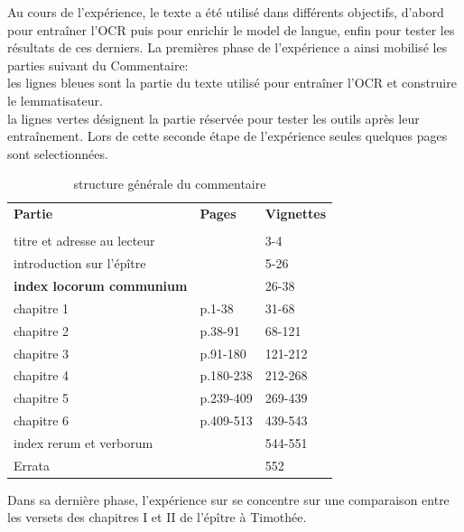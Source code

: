\documentclass[11pt,french]{article}
\begin{document}
Au cours de l'expérience, le texte a été utilisé dans différents objectifs, d'abord pour entraîner l'OCR puis pour enrichir le model de langue, enfin pour tester les résultats de ces derniers. La premières phase de l'expérience a ainsi mobilisé les parties suivant du Commentaire:\\ 
     les lignes bleues sont la partie du texte          utilisé pour entraîner l'OCR et construire le lemmatisateur.\\ 
     la lignes vertes désignent la partie réservée pour tester les outils après leur entraînement. Lors de cette seconde étape de l'expérience seules quelques pages sont selectionnées.\\
\begin{table}[h]
    \small
    \centering
    \begin{tabular}{lll}
        \toprule
        \textbf{Partie} & \textbf{Pages} & \textbf{Vignettes} \\
        \textbf{} & \textbf{} & \textbf{\centering{e-rara}} \\
        \midrule
        \rowcolor{blue!10}titre et adresse au lecteur & & 3-4\\ %
        \rowcolor{blue!10}introduction sur l'épître & & 5-26 \\
        \rowcolor{blue!10}\textbf{index locorum communium} & & 26-38 \\
        \rowcolor{blue!10}chapitre 1 & p.1-38 & 31-68 \\
        \rowcolor{blue!10}chapitre 2 & p.38-91 & 68-121  \\
        chapitre 3 & p.91-180 & 121-212  \\
        chapitre 4 & p.180-238 & 212-268  \\
        \rowcolor{green!10}chapitre 5 & p.239-409 & 269-439  \\
        chapitre 6 & p.409-513 & 439-543  \\
        index rerum et verborum & & 544-551 \\
        Errata & & 552 \\
        \bottomrule
    \end{tabular}
    \caption{structure générale du commentaire}
\end{table}
\par 
Dans sa dernière phase, l'expérience sur se concentre sur une comparaison entre les versets des chapitres I et II de l'épître à Timothée.
\end{document}
